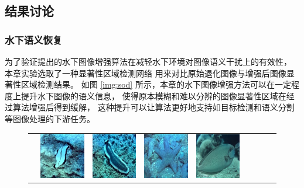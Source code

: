 \subsection{结果讨论}
\subsubsection{水下语义恢复}
为了验证提出的水下图像增强算法在减轻水下环境对图像语义干扰上的有效性，
本章实验选取了一种显著性区域检测网络 \cite{sod} 用来对比原始退化图像与增强后图像显著性区域检测结果。
如图 \ref{img:sod} 所示，本章的水下图像增强方法可以在一定程度上提升水下图像的语义信息，
使得原本模糊和难以分辨的图像显著性区域在经过算法增强后得到缓解，
这种提升可以让算法更好地支持如目标检测和语义分割等图像处理的下游任务。
\begin{figure}[ht]
	\begin{center}
		\begin{tabular}{ccccccccc}
            \vspace{-0.5mm}  
            \raisebox{0.8cm}{\footnotesize Input}   & \hspace{-0.36cm}
            \includegraphics[width = 0.10\linewidth, height=0.10\linewidth]{figures/ch3/compare/discussion/SOD/original/1.JPEG} & \hspace{-0.43cm} 
            \includegraphics[width = 0.10\linewidth, height=0.10\linewidth]{figures/ch3/compare/discussion/SOD/original/2.JPEG}  & \hspace{-0.43cm} 
            \includegraphics[width = 0.10\linewidth, height=0.10\linewidth]{figures/ch3/compare/discussion/SOD/original/3.jpg}  & \hspace{-0.43cm}  
            \includegraphics[width = 0.10\linewidth, height=0.10\linewidth]{figures/ch3/compare/discussion/SOD/original/4.jpg}  & \hspace{-0.43cm} 

\end{tabular}
\end{center}
\end{figure}
